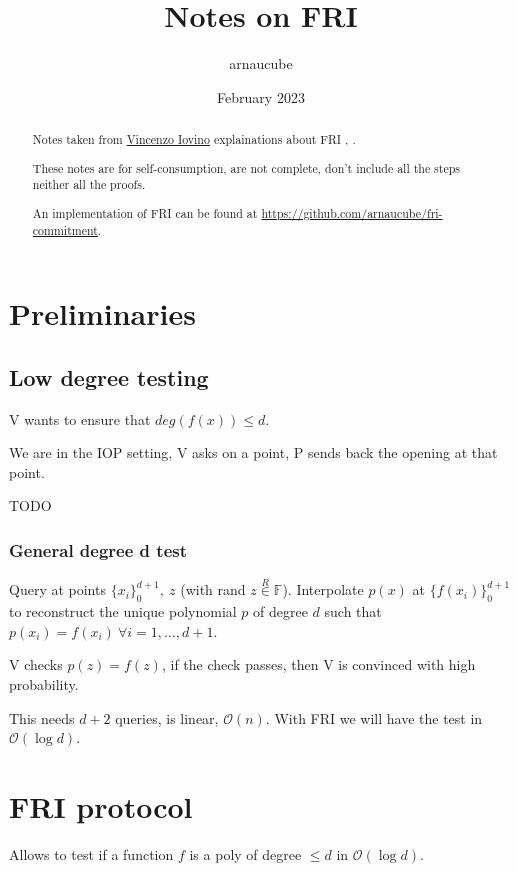 \documentclass{article}
\title{Notes on FRI}
\author{arnaucube}
\date{February 2023}
\theoremstyle{definition}
\begin{document}
\maketitle

\begin{abstract}
	Notes taken from \href{https://sites.google.com/site/vincenzoiovinoit/}{Vincenzo Iovino} explainations about FRI \cite{fri}, \cite{cryptoeprint:2022/1216}.

	These notes are for self-consumption, are not complete, don't include all the steps neither all the proofs.

	An implementation of FRI can be found at \href{https://github.com/arnaucube/fri-commitment}{https://github.com/arnaucube/fri-commitment}.
\end{abstract}

\tableofcontents

\section{Preliminaries}
\subsection{Low degree testing}
V wants to ensure that $deg(f(x)) \leq d$.

We are in the IOP setting, V asks on a point, P sends back the opening at that point.

TODO

\subsubsection{General degree d test}

Query at points $\{ x_i \}_0^{d+1},~z$ (with rand $z \overset{R}{\in} \mathbb{F}$).
Interpolate $p(x)$ at $\{f(x_i)\}_0^{d+1}$ to reconstruct the unique polynomial $p$ of degree $d$ such that $p(x_i)=f(x_i)~\forall i=1, \ldots, d+1$.

V checks $p(z)=f(z)$, if the check passes, then V is convinced with high probability.

This needs $d+2$ queries, is linear, $\mathcal{O}(n)$. With FRI we will have the test in $\mathcal{O}(\log{}d)$.

\section{FRI protocol}
Allows to test if a function $f$ is a poly of degree $\leq d$ in $\mathcal{O}(\log{}d)$.
\end{document}
